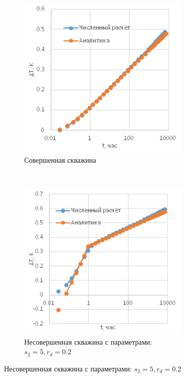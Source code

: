 \begin{figure}[H]

	\begin{subfigure}[b]{0.5\textwidth}
		\centering
		\includegraphics[width=0.9\textwidth]{pic/perfect.png}
		\caption{Совершенная скважина}
		\label{pic:perf}
	\end{subfigure}
~
	\begin{subfigure}[b]{0.5\textwidth}
		\centering
		\includegraphics[width=0.9\textwidth]{pic/imperf1.png}
		\caption{Несовершенная скважина с параметрами: $s_2=5, r_d = 0.2$}

\end{subfigure}
\end{figure}
